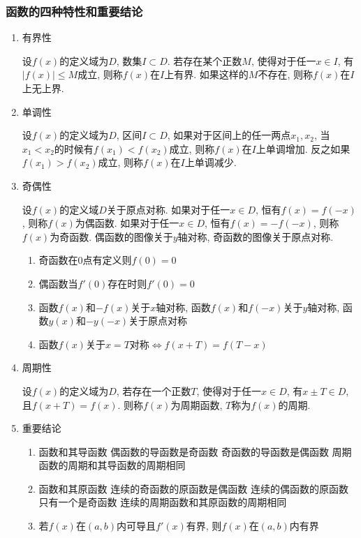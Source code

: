 \subsubsection{函数的四种特性和重要结论}
\begin{enumerate}
\item 有界性\par
设$ f(x) $的定义域为$ D $, 数集$ I\subset D $. 若存在某个正数$ M $, 使得对于任一$ x\in I $, 有$ |f(x)|\le M $成立, 则称$ f(x) $在$ I $上有界. 如果这样的$ M $不存在, 则称$ f(x) $在$ I $上无上界.
\item 单调性\par
设$ f(x) $的定义域为$ D $, 区间$ I\subset D $, 如果对于区间上的任一两点$ x_{1},x_{2} $, 当$ x_{1}<x_{2} $的时候有$ f(x_{1})<f(x_{2}) $成立, 则称$ f(x) $在$ I $上单调增加. 反之如果$ f(x_{1})>f(x_{2}) $成立, 则称$ f(x) $在$ I $上单调减少.
\item 奇偶性\par
设$ f(x) $的定义域$ D $关于原点对称. 如果对于任一$ x\in D $, 恒有$ f(x)=f(-x) $, 则称$ f(x) $为偶函数. 如果对于任一$ x\in D $, 恒有$ f(x)=-f(-x) $, 则称$ f(x) $为奇函数. 偶函数的图像关于$ y $轴对称, 奇函数的图像关于原点对称.
\begin{tcolorbox}
\begin{enumerate}
\item 奇函数在$ 0 $点有定义则$ f(0)=0 $
\item 偶函数当$ f'(0) $存在时则$ f'(0)=0 $
\item 函数$ f(x) $和$ -f(x) $关于$ x $轴对称, 函数$ f(x) $和$ f(-x) $关于$ y $轴对称, 函数$ y(x) $和$ -y(-x) $关于原点对称
\item 函数$ f(x) $关于$ x=T $对称$ \Leftrightarrow f(x+T)=f(T-x) $
\end{enumerate}
\end{tcolorbox}
\item 周期性\par
设$ f(x) $的定义域为$ D $, 若存在一个正数$ T $, 使得对于任一$ x\in D $, 有$ x\pm T\in D $, 且$ f(x+T)=f(x) $. 则称$ f(x) $为周期函数, $ T $称为$ f(x) $的周期.
\item 重要结论
\begin{enumerate}
\item 函数和其导函数
\subitem 偶函数的导函数是奇函数
\subitem 奇函数的导函数是偶函数
\subitem 周期函数的周期和其导函数的周期相同
\item 函数和其原函数
\subitem 连续的奇函数的原函数是偶函数
\subitem 连续的偶函数的原函数只有一个是奇函数
\subitem 连续的周期函数和其原函数的周期相同
\item 若$ f(x) $在$ (a,b) $内可导且$ f'(x) $有界, 则$ f(x) $在$ (a,b) $内有界
\end{enumerate}
\end{enumerate}

